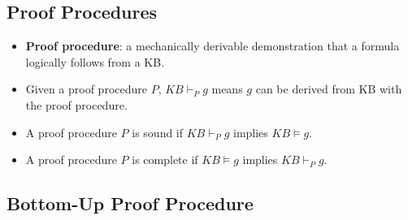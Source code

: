 \documentclass{article}
\begin{document}
\subsection{Proof Procedures}

\begin{itemize}
    \item \textbf{Proof procedure}: a mechanically derivable demonstration that a formula logically follows from a KB.
    \item Given a proof procedure $P$, $KB \vdash_P g$ means $g$ can be derived from KB with the proof procedure.
    \item A proof procedure $P$ is sound if $KB \vdash_P g$ implies $KB \vDash g$.
    \item A proof procedure $P$ is complete if $KB \vDash g$ implies $KB \vdash_P g$.
\end{itemize}

\subsection{Bottom-Up Proof Procedure}
\end{document}
